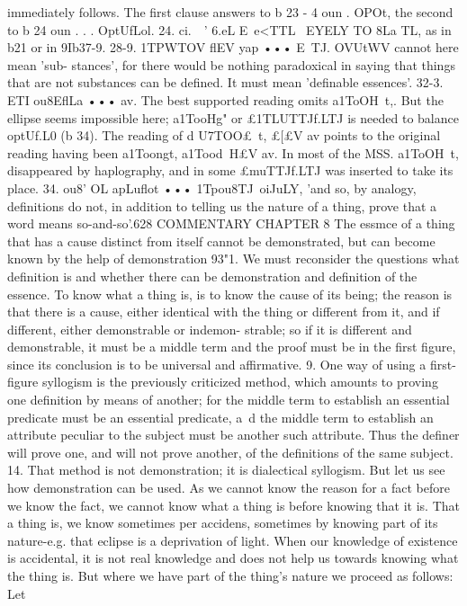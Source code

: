 {{{{{{{{{{{{{{{{{{{{{{{{{{{{{{immediately follows. The first clause answers to b 23 - 4 oun .
OPOt, the second to b 24 oun . . . OptUfLol.
24. ci.~~' 6.eL E~e<TTL ~EYELY TO 8La TL, as in b21 or in 9Ib37-9.
28-9. 1TPWTOV flEV yap ••• E~TJ. OVUtWV cannot here mean 'sub-
stances', for there would be nothing paradoxical in saying that
things that are not substances can be defined. It must mean
'definable essences'.
32-3. ETI ou8EflLa ••• av. The best supported reading omits
a1ToOH~t,. But the ellipse seems impossible here; a1TooHg" or
£1TLUTTJf.LTJ is needed to balance optUf.L0{ (b 34). The reading of d
U7TOO£~t, £[£V av points to the original reading having been
a1Toongt, a1Tood~H£V av. In most of the MSS. a1ToOH~t, disappeared
by haplography, and in some £muTTJf.LTJ was inserted to take its
place.
34. ou8' OL apLuflot ••• 1Tpou8TJ~oiJuLY, 'and so, by analogy,
definitions do not, in addition to telling us the nature of a thing,
prove that a word means so-and-so'.628
COMMENTARY
CHAPTER 8
The essmce of a thing that has a cause distinct from itself cannot be
demonstrated, but can become known by the help of demonstration
93"1. We must reconsider the questions what definition is and
whether there can be demonstration and definition of the essence.
To know what a thing is, is to know the cause of its being; the
reason is that there is a cause, either identical with the thing or
different from it, and if different, either demonstrable or indemon-
strable; so if it is different and demonstrable, it must be a middle
term and the proof must be in the first figure, since its conclusion
is to be universal and affirmative.
9. One way of using a first-figure syllogism is the previously
criticized method, which amounts to proving one definition by
means of another; for the middle term to establish an essential
predicate must be an essential predicate, a~d the middle term
to establish an attribute peculiar to the subject must be another
such attribute. Thus the definer will prove one, and will not prove
another, of the definitions of the same subject.
14. That method is not demonstration; it is dialectical
syllogism. But let us see how demonstration can be used. As we
cannot know the reason for a fact before we know the fact, we
cannot know what a thing is before knowing that it is. That a thing
is, we know sometimes per accidens, sometimes by knowing part of
its nature-e.g. that eclipse is a deprivation of light. When our
knowledge of existence is accidental, it is not real knowledge and
does not help us towards knowing what the thing is. But where
we have part of the thing's nature we proceed as follows: Let
}}}}}}}}}}}}}}}}}}}}}}}}}}}}}}}
